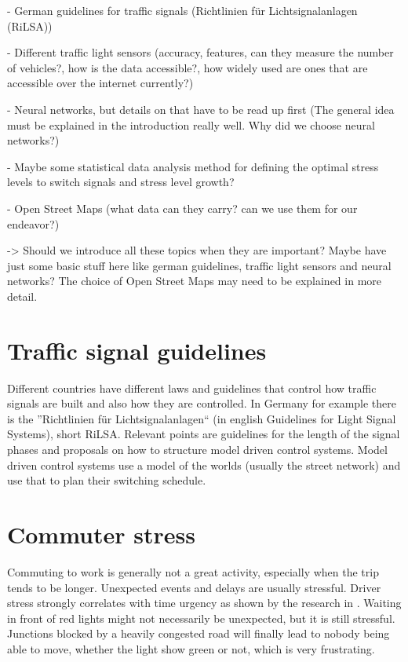 - German guidelines for traffic signals (Richtlinien für Lichtsignalanlagen (RiLSA))

- Different traffic light sensors (accuracy, features, can they measure the number of vehicles?, how is the data accessible?, how widely used are ones that are accessible over the internet currently?)

- Neural networks, but details on that have to be read up first (The general idea must be explained in the introduction really well. Why did we choose neural networks?)

- Maybe some statistical data analysis method for defining the optimal stress levels to switch signals and stress level growth?

- Open Street Maps (what data can they carry? can we use them for our endeavor?)

-> Should we introduce all these topics when they are important? Maybe have just some basic stuff here like german guidelines, traffic light sensors and neural networks? The choice of Open Street Maps may need to be explained in more detail.

\newpage

\section{Traffic signal guidelines}

Different countries have different laws and guidelines that control how traffic signals are built and also how they are controlled.
In Germany for example there is the ''Richtlinien für Lichtsignalanlagen`` (in english Guidelines for Light Signal Systems), short RiLSA. Relevant points are guidelines for the length of the signal phases and proposals on how to structure model driven control systems. Model driven control systems use a model of the worlds (usually the street network) and use that to plan their switching schedule.

\section{Commuter stress}

Commuting to work is generally not a great activity, especially when the trip tends to be longer. Unexpected events and delays are usually stressful. Driver stress strongly correlates with time urgency as shown by the research in \cite{aggressive_behaviour}. Waiting in front of red lights might not necessarily be unexpected, but it is still stressful. Junctions blocked by a heavily congested road will finally lead to nobody being able to move, whether the light show green or not, which is very frustrating.

